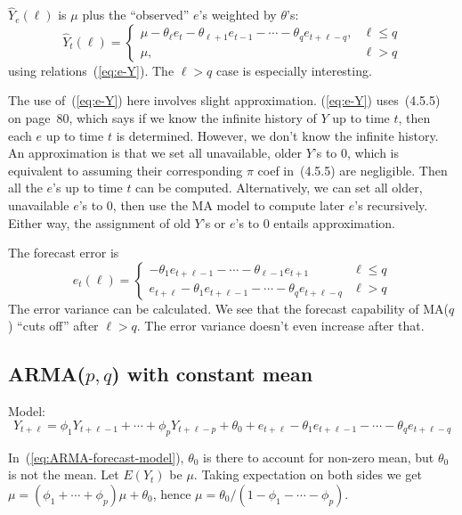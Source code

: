 \documentclass[12pt]{article}
\begin{document}
$\hat{Y}_e(\ell)$ is $\mu$ plus the ``observed'' $e$'s weighted by
$\theta$'s:
\[
\hat{Y}_t(\ell)
=
\begin{cases}
\mu - \theta_{\ell} e_t - \theta_{\ell + 1} e_{t-1}
    - \dotsb - \theta_{q} e_{t+\ell-q},
    & \ell \le q
\\
\mu, & \ell > q
\end{cases}
\]
using relations~(\ref{eq:e-Y}).
The $\ell > q$ case is especially interesting.

\alert
The use of~(\ref{eq:e-Y}) here involves
slight approximation.
(\ref{eq:e-Y}) uses~(4.5.5) on page~80,
which says if we know the infinite history of $Y$ up to time
$t$, then each $e$ up to time $t$ is determined.
However, we don't know the infinite history.
An approximation is that we set all
unavailable, older $Y$'s to 0,
which is equivalent to assuming
their corresponding $\pi$ coef in~(4.5.5) are negligible.
Then all the $e$'s up to time $t$ can be computed.
Alternatively, we can set all older, unavailable $e$'s to 0,
then use the MA model to compute later $e$'s recursively.
Either way, the assignment of old $Y$'s or $e$'s to 0
entails approximation.

The forecast error is
\[
e_t(\ell) =
\begin{cases}
-\theta_1 e_{t+\ell-1} -\dotsb
    - \theta_{\ell-1} e_{t+1} & \ell \le q
\\
e_{t+\ell} - \theta_1 e_{t+\ell-1} -\dotsb
    - \theta_q e_{t+\ell-q} & \ell > q
\end{cases}
\]
The error variance can be calculated.
We see that the forecast capability of MA($q$)
``cuts off'' after $\ell > q$.
The error variance doesn't even increase after that.

\subsection{ARMA($p, q$) with constant mean}

Model:
\begin{equation}\label{eq:ARMA-forecast-model}
Y_{t+\ell}
= \phi_1 Y_{t+\ell-1} + \dotsb + \phi_p Y_{t+\ell - p}
   + \theta_0 + e_{t+\ell}
   - \theta_1 e_{t+\ell - 1}
   - \dotsb
   - \theta_q e_{t+\ell-q}
\end{equation}

\alert
In~(\ref{eq:ARMA-forecast-model}),
$\theta_0$ is there to account for non-zero mean,
but $\theta_0$ is not the mean.
Let $E(Y_t)$ be $\mu$.
Taking expectation on both sides we get
$\mu = (\phi_1 +\dotsb + \phi_p) \mu + \theta_0$,
hence
$\mu = \theta_0 / (1 - \phi_1 - \dotsb - \phi_p)$.
\end{document}
